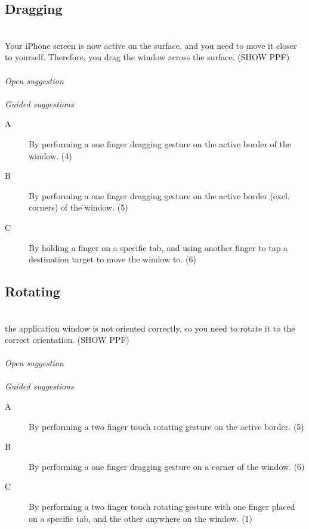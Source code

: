 \subsection{Dragging}
\hfill\\
Your iPhone screen is now active on the surface, and you need to move it closer to yourself. Therefore, you drag the window across the surface.
(SHOW PPF)
\\\\
\emph{Open suggestion}
\\\\
\emph{Guided suggestions}
\begin{description}
\item[A]{By performing a one finger dragging gesture on the active border of the window. (4)}
\item[B]{By performing a one finger dragging gesture on the active border (excl. corners) of the window. (5)}
\item[C]{By holding a finger on a specific tab, and using another finger to tap a destination target to move the window to. (6)}
\end{description}


\subsection{Rotating}
\hfill\\
the application window is not oriented correctly, so you need to rotate it to the correct orientation. 
(SHOW PPF)
\\\\
\emph{Open suggestion}
\\\\
\emph{Guided suggestions}
\begin{description}
\item[A]{By performing a two finger touch rotating gesture on the active border. (5)}
\item[B]{By performing a one finger dragging gesture on a corner of the window. (6)}
\item[C]{By performing a two finger touch rotating gesture with one finger placed on a specific tab, and the other anywhere on the window. (1)}
\end{description}


